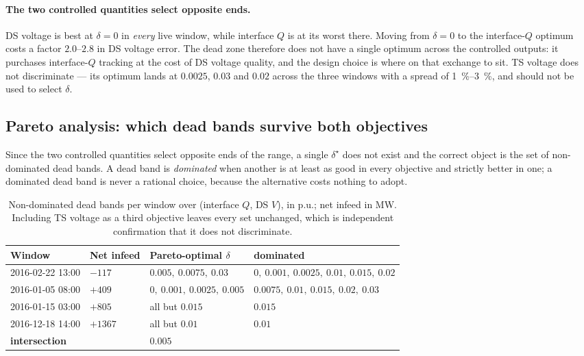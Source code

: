 \documentclass[11pt,a4paper]{article}
\newcommand{\pu}{\ensuremath{\mathrm{p.u.}}}
\newcommand{\dz}{\ensuremath{\delta}}
\begin{document}
\paragraph{The two controlled quantities select opposite ends.} DS voltage is
best at $\dz=0$ in \emph{every} live window, while interface $Q$ is at its worst
there. Moving from $\dz=0$ to the interface-$Q$ optimum costs a factor
$2.0$--$2.8$ in DS voltage error. The dead zone therefore does not have a single
optimum across the controlled outputs: it purchases interface-$Q$ tracking at
the cost of DS voltage quality, and the design choice is where on that exchange
to sit. TS voltage does not discriminate --- its optimum lands at $0.0025$,
$0.03$ and $0.02$ across the three windows with a spread of \SIrange{1}{3}
{\percent}, and should not be used to select $\dz$.

\subsection{Pareto analysis: which dead bands survive both objectives}
\label{sec:pareto}

Since the two controlled quantities select opposite ends of the range, a single
$\dz^\star$ does not exist and the correct object is the set of non-dominated
dead bands. A dead band is \emph{dominated} when another is at least as good in
every objective and strictly better in one; a dominated dead band is never a
rational choice, because the alternative costs nothing to adopt.

\begin{table}[htbp]
\centering
\begin{tabular}{llll}
\toprule
Window & Net infeed & Pareto-optimal $\dz$ & dominated \\
\midrule
2016-02-22 13:00 & $-117$ & $0.005,\ 0.0075,\ 0.03$
  & $0,\ 0.001,\ 0.0025,\ 0.01,\ 0.015,\ 0.02$ \\
2016-01-05 08:00 & $+409$ & $0,\ 0.001,\ 0.0025,\ 0.005$
  & $0.0075,\ 0.01,\ 0.015,\ 0.02,\ 0.03$ \\
2016-01-15 03:00 & $+805$ & all but $0.015$ & $0.015$ \\
2016-12-18 14:00 & $+1367$ & all but $0.01$ & $0.01$ \\
\midrule
\textbf{intersection} & & $\mathbf{0.005}$ & \\
\bottomrule
\end{tabular}
\caption{Non-dominated dead bands per window over (interface $Q$, DS $V$), in
\pu; net infeed in \si{\mega\watt}. Including TS voltage as a third objective
leaves every set unchanged, which is independent confirmation that it does not
discriminate.}
\label{tab:pareto}
\end{table}
\end{document}
